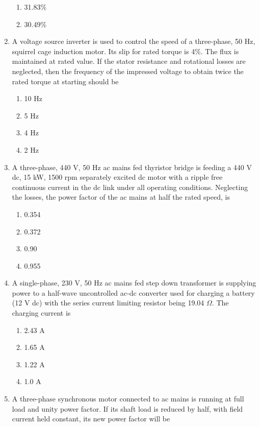 \documentclass[journal]{IEEEtran}
\begin{document}
\begin{enumerate}
\begin{enumerate}
    \item 31.83\%
    \item 30.49\% \\
\end{enumerate}
\item A voltage source inverter is used to control the speed of a three-phase, 50 Hz, squirrel cage induction motor. Its slip for rated torque is 4\%. The flux is maintained at rated value. If the stator resistance and rotational losses are neglected, then the frequency of the impressed voltage to obtain twice the rated torque at starting should be
 \begin{enumerate}
     \item 10 Hz
     \item 5 Hz
     \item 4 Hz
     \item 2 Hz \\
 \end{enumerate}
\item A three-phase, 440 V, 50 Hz ac mains fed thyristor bridge is feeding a 440 V dc, 15 kW, 1500 rpm separately excited dc motor with a ripple free continuous current in the dc link under all operating conditions. Neglecting the losses, the power factor of the ac mains at half the rated speed, is
\begin{enumerate}
     \item 0.354
     \item 0.372
     \item 0.90
     \item 0.955 \\
 \end{enumerate}
\item A single-phase, 230 V, 50 Hz ac mains fed step down transformer  is supplying power to a half-wave uncontrolled ac-dc converter used for charging a battery (12 V dc) with the series current limiting resistor being 19.04 $\Omega$. The charging current is
\begin{enumerate}
    \item 2.43 A
    \item 1.65 A
    \item 1.22 A
    \item 1.0 A \\
\end{enumerate}
\item A three-phase synchronous motor connected to ac mains is running at full load and unity power factor. If its shaft load is reduced by half, with field current held constant, its new power factor will be

\end{enumerate}
\end{document}

